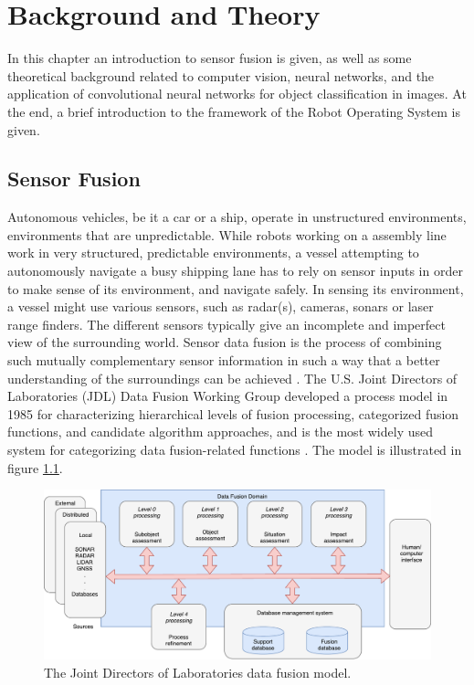 
\chapter{Background and Theory}
In this chapter an introduction to sensor fusion is given, as well as some theoretical background related to computer vision, neural networks, and the application of convolutional neural networks for object classification in images. At the end, a brief introduction to the framework of the Robot Operating System is given.
\section{Sensor Fusion}
\label{section:fusion}
Autonomous vehicles, be it a car or a ship, operate in unstructured environments, environments that are unpredictable. While robots working on a assembly line work in very structured, predictable environments, a vessel attempting to autonomously navigate a busy shipping lane has to rely on sensor inputs in order to make sense of its environment, and navigate safely. In sensing its environment, a vessel might use various sensors, such as radar(s), cameras, sonars or laser range finders. The different sensors typically give an incomplete and imperfect view of the surrounding world. Sensor data fusion is the process of combining such mutually complementary sensor information in such a way that a better understanding of the surroundings can be achieved \cite{sensorFusion1}.
The U.S. Joint Directors of Laboratories (JDL) Data Fusion Working Group developed a process model in 1985 for characterizing hierarchical levels of fusion processing, categorized fusion functions, and candidate algorithm approaches, and is the most widely used system for categorizing data fusion-related functions \cite{JDLFusion}. The model is illustrated in figure \ref{fig:jdl_fusion}.
\begin{figure}[H]
    \centering
    \includegraphics[width=\linewidth]{fig/JDLfusion.pdf}
    \caption{The Joint Directors of Laboratories data fusion model.}
    \label{fig:jdl_fusion}
\end{figure}
